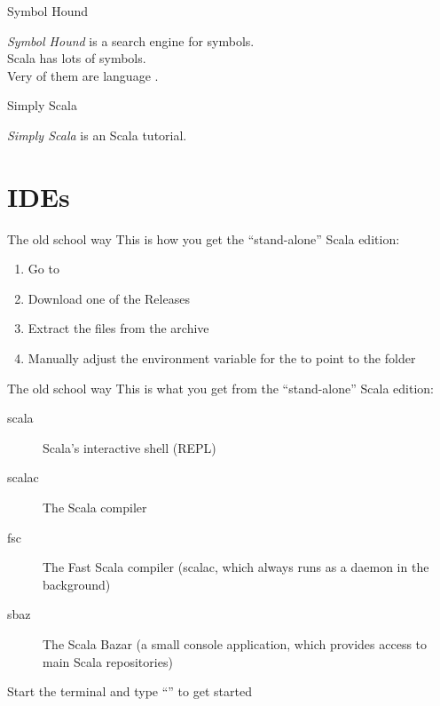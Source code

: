 
\begin{frame}{Symbol Hound}
\begin{center}
\end{center}
\begin{center}
\emph{Symbol Hound} is a search engine for symbols.\\
Scala has lots of symbols.\\
Very  of them are language .
\end{center}
\end{frame}

\begin{frame}{Simply Scala}
\begin{center}
\end{center}
\begin{center}
\emph{Simply Scala} is an  Scala tutorial.
\end{center}
\end{frame}

\section{IDEs}
\begin{frame}{The old school way}
This is how you get the ``stand-alone'' Scala edition:
\begin{enumerate}
  \item Go to
  \item Download one of the  Releases
  \item Extract the files from the archive
  \item Manually adjust the environment variable for the  to
  point to the  folder
\end{enumerate}
\end{frame}

\begin{frame}{The old school way}
This is what you get from the ``stand-alone'' Scala edition:
\begin{description}
  \item[scala] Scala's interactive shell (REPL)
  \item[scalac] The Scala compiler
  \item[fsc] The Fast Scala compiler (scalac, which always runs as a daemon in
  the background)
  \item[sbaz] The Scala Bazar (a small console application, which provides
  access to main Scala repositories)
\end{description}
\begin{center}
Start the terminal and type ``'' to get started
\end{center}
\end{frame}

